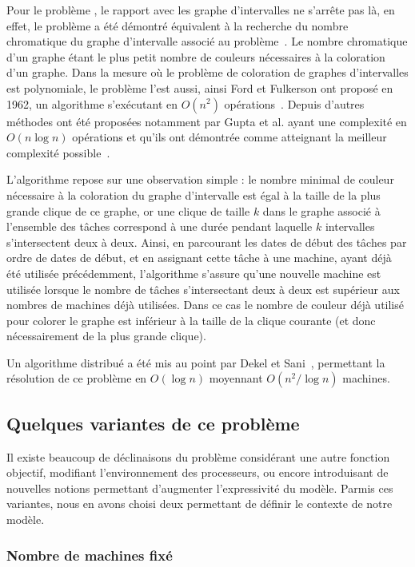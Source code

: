 \documentclass[a4paper,11pt]{article}
\begin{document}
Pour le problème \bisched, le rapport avec les graphe d'intervalles ne s'arrête pas là, en effet, le
problème a été démontré équivalent à la recherche du nombre chromatique du graphe d'intervalle
associé au problème~\cite{golumbicalgorithmic}. Le nombre chromatique d'un graphe étant le plus
petit nombre de couleurs nécessaires à la coloration d'un graphe. Dans la mesure où le problème de
coloration de graphes d'intervalles est polynomiale, le problème \bisched l'est aussi, ainsi Ford et
Fulkerson ont proposé en 1962, un algorithme s'exécutant en $O(n^2)$
opérations~\cite{ford1962network}. Depuis d'autres méthodes ont été proposées notamment par Gupta et
al. ayant une complexité en $O(n\log n)$ opérations et qu'ils ont démontrée comme atteignant la
meilleur complexité possible~\cite{gupta_optimal_1978}.

L'algorithme repose sur une observation simple : le nombre minimal de couleur nécessaire à la
coloration du graphe d'intervalle est égal à la taille de la plus grande clique de ce graphe, or une
clique de taille $k$ dans le graphe associé à l'ensemble des tâches correspond à une durée pendant
laquelle $k$ intervalles s'intersectent deux à deux. Ainsi, en parcourant les dates de début des tâches par
ordre de dates de début, et en assignant cette tâche à une machine, ayant déjà été utilisée
précédemment, l'algorithme s'assure qu'une nouvelle machine est utilisée lorsque le nombre de
tâches s'intersectant deux à deux est supérieur aux nombres de machines déjà utilisées. Dans ce cas
le nombre de couleur déjà utilisé pour colorer le graphe est inférieur à la taille de la clique
courante (et donc nécessairement de la plus grande clique).

Un algorithme distribué a été mis au point par Dekel et Sani~\cite{dekel1983parallel}, permettant la
résolution de ce problème en $O(\log n)$ moyennant $O(n^2 / \log n)$ machines.

\subsection{Quelques variantes de ce problème}

Il existe beaucoup de déclinaisons du problème \bisched considérant une autre fonction objectif,
modifiant l'environnement des processeurs, ou encore introduisant de nouvelles notions permettant
d'augmenter l'expressivité du modèle. Parmis ces variantes, nous en avons choisi deux permettant de
définir le contexte de notre modèle.

\subsubsection{Nombre de machines fixé}
\end{document}

